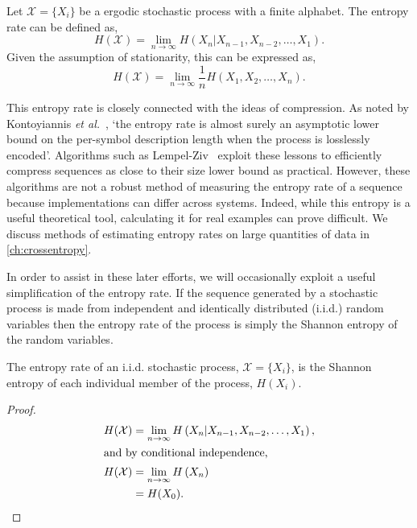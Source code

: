 \begin{definition}\label{def:entropyrate}
	Let  $\mathcal{X}= \{ X_i \}$ be a ergodic stochastic process with a finite alphabet. 
	The entropy rate can be defined as,
	\begin{equation}\label{eq:entropyrate}
	H(\mathcal{X})=\lim _{n \rightarrow \infty} H\left(X_{n} | X_{n-1}, X_{n-2}, \ldots, X_{1}\right).
	\end{equation}
	Given the assumption of stationarity, this can be expressed as,
	\begin{equation}
	H(\mathcal{X})=\lim _{n \rightarrow \infty} \frac{1}{n} H\left(X_{1}, X_{2}, \ldots, X_{n}\right).
	\end{equation}
\end{definition}

This entropy rate is closely connected with the ideas of compression. As noted by Kontoyiannis \emph{et al.}~\cite{kontoyiannis_nonparametric_1998}, `the entropy rate is almost surely an asymptotic lower bound on the per-symbol description length when the process is losslessly encoded'. Algorithms such as Lempel-Ziv~\cite{ziv_compression_1978} exploit these lessons to efficiently compress sequences as close to their size lower bound as practical. However, these algorithms are not a robust method of measuring the entropy rate of a sequence because implementations can differ across systems. Indeed, while this entropy is a useful theoretical tool, calculating it for real examples can prove difficult. We discuss methods of estimating entropy rates on large quantities of data in \autoref{ch:crossentropy}.

In order to assist in these later efforts, we will occasionally exploit a useful simplification of the entropy rate. If the sequence generated by a stochastic process is made from independent and identically distributed  (i.i.d.) random variables then the entropy rate of the process is simply the Shannon entropy of the random variables. 

\begin{lemma}
	The entropy rate of an i.i.d. stochastic process, $\mathcal{X}= \{ X_i \}$, is the Shannon entropy of each individual member of the process, $H(X_i)$.
\end{lemma}

\begin{proof}\label{proof:iidentroptrate}
\begin{align}
H(\mathcal{X})&=\lim _{n \rightarrow \infty} H\left(X_{n} | X_{n-1}, X_{n-2}, \ldots, X_{1}\right), \\
\intertext{and by conditional independence,}
H(\mathcal{X}) &=\lim _{n \rightarrow \infty} H\left(X_{n} \right) \nonumber \\
&= H(X_0).
\end{align}
\end{proof}

